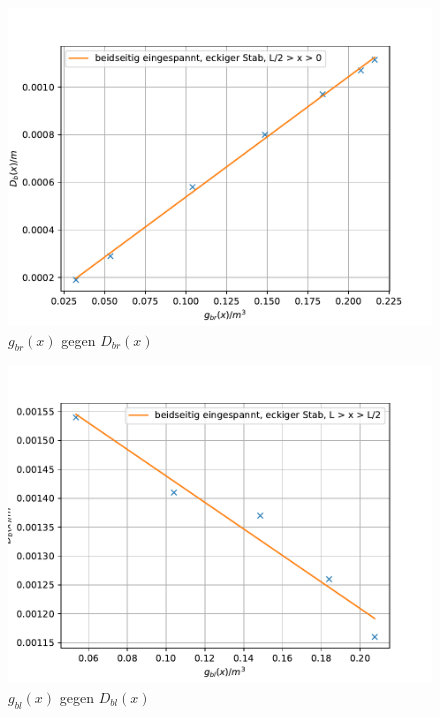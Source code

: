 \begin{figure}[h!]
  \centering
  \includegraphics[width=\textwidth]{plotdgbr.pdf}
  \caption{$g_{br}(x)$ gegen $D_{br}(x)$}
  \label{fig:dgbr}
\end{figure}

\begin{figure}[h!]
  \centering
  \includegraphics[width=\textwidth]{plotdgbl.pdf}
  \caption{$g_{bl}(x)$ gegen $D_{bl}(x)$}
  \label{fig:dgbl}
\end{figure}

\begin{landscape}
  
\end{landscape}

